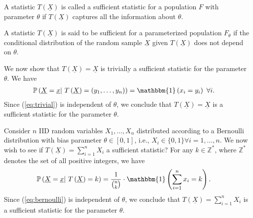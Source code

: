 \documentclass[a4paper,english,12pt]{article}
\begin{document}
\begin{defn}
	A statistic $ T\left(\underline{X}\right) $ is called a sufficient statistic for a population $ F $ with parameter $ \theta $ if $ T\left(\underline{X}\right) $ captures all the information about $ \theta $.
\end{defn}

\begin{defn}
	A statistic $ T\left(\underline{X}\right) $ is said to be sufficient for a parameterized population $ F_{\theta} $ if the conditional distribution of the random sample $ \underline{X} $ given $ T\left(\underline{X}\right) $ does not depend on $ \theta $. 
\end{defn}

\begin{exmp}
	We now show that $ T(\underline{X})=\underline{X} $ is trivially a sufficient statistic for the parameter $ \theta $. We have
	\begin{align}
	 \mathbb{P}\left(\underline{X} = \underline{x} \vert ~ T\left(\underline{X}\right) = \left(y_1, \ldots, y_n\right) \right) &= \mathbbm{1} \left( x_i = y_i \right)~ \forall i.\label{eq:trivial}
	\end{align}
	Since (\ref*{eq:trivial}) is independent of $ \theta $, we conclude that $ T\left(\underline{X}\right) = \underline{X}$ is a sufficient statistic for the parameter $ \theta $.
\end{exmp}

\begin{exmp}
	Consider $ n $ IID random variables $ X_1, \dots, X_n $ distributed according to a Bernoulli distribution with bias parameter $ \theta \in \left[0,1\right]$, i.e., $ X_i \in \{0,1\} \forall i=1,\ldots,n $. We now wish to see if $ T\left(\underline{X}\right) = \sum\limits_{i=1}^{n} X_i$ a sufficient statistic? For any $ k\in \mathbb{Z}^{*} $, where $ \mathbb{Z}^{*} $ denotes the set of all positive integers, we have
	\begin{align}
	\mathbb{P}\left(\underline{X} = \underline{x} \vert ~ T\left(\underline{X}\right) = k \right) &= \frac{1}{ \binom{n}{k}} \cdot \mathbbm{1} \left( \sum_{i=1}^{n} x_i = k \right).\label{eq:bernoulli}
	\end{align}     
	Since (\ref*{eq:bernoulli}) is independent of $ \theta $, we conclude that $ T\left(\underline{X}\right) = \sum\limits_{i=1}^{n} X_i $ is a sufficient statistic for the parameter $ \theta $. 
\end{exmp}
\end{document}
